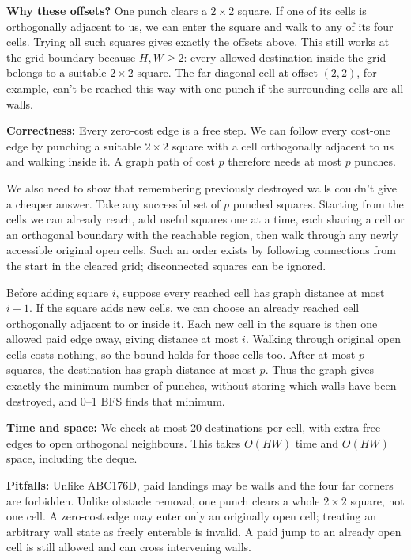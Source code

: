 \documentclass[11pt]{article}
\newcommand{\correct}[1]{\par\textbf{Correctness:} #1}
\newcommand{\bounds}[1]{\par\textbf{Time and space:} #1}
\newcommand{\pitfalls}[1]{\par\textbf{Pitfalls:} #1}
\begin{document}
\textbf{Why these offsets?} One punch clears a $2\times2$ square. If one of its cells is orthogonally adjacent to us, we can enter the square and walk to any of its four cells. Trying all such squares gives exactly the offsets above. This still works at the grid boundary because $H,W\geq2$: every allowed destination inside the grid belongs to a suitable $2\times2$ square. The far diagonal cell at offset $(2,2)$, for example, can't be reached this way with one punch if the surrounding cells are all walls.

\correct{Every zero-cost edge is a free step. We can follow every cost-one edge by punching a suitable $2\times2$ square with a cell orthogonally adjacent to us and walking inside it. A graph path of cost $p$ therefore needs at most $p$ punches.

We also need to show that remembering previously destroyed walls couldn't give a cheaper answer. Take any successful set of $p$ punched squares. Starting from the cells we can already reach, add useful squares one at a time, each sharing a cell or an orthogonal boundary with the reachable region, then walk through any newly accessible original open cells. Such an order exists by following connections from the start in the cleared grid; disconnected squares can be ignored.

Before adding square $i$, suppose every reached cell has graph distance at most $i-1$. If the square adds new cells, we can choose an already reached cell orthogonally adjacent to or inside it. Each new cell in the square is then one allowed paid edge away, giving distance at most $i$. Walking through original open cells costs nothing, so the bound holds for those cells too. After at most $p$ squares, the destination has graph distance at most $p$. Thus the graph gives exactly the minimum number of punches, without storing which walls have been destroyed, and 0--1 BFS finds that minimum.}
\bounds{We check at most 20 destinations per cell, with extra free edges to open orthogonal neighbours. This takes $O(HW)$ time and $O(HW)$ space, including the deque.}
\pitfalls{Unlike ABC176D, paid landings may be walls and the four far corners are forbidden. Unlike obstacle removal, one punch clears a whole $2\times2$ square, not one cell. A zero-cost edge may enter only an originally open cell; treating an arbitrary wall state as freely enterable is invalid. A paid jump to an already open cell is still allowed and can cross intervening walls.}
\end{document}
